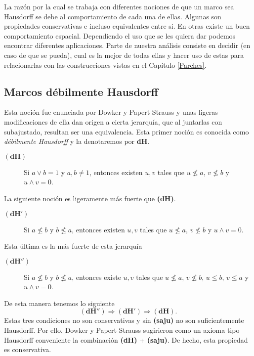 La razón por la cual se trabaja con diferentes nociones de que un marco sea Hausdorff se debe al comportamiento de cada una de ellas. Algunas son propiedades conservativas e incluso equivalentes entre si. En otras existe un buen comportamiento espacial. Dependiendo el uso que se les quiera dar podemos encontrar diferentes aplicaciones. Parte de nuestra análisis consiste en decidir (en caso de que se pueda), cual es la mejor de todas ellas y hacer uso de estas para relacionarlas con las construcciones vistas en el Capítulo \ref{Parches}.

\subsection{Marcos débilmente Hausdorff}

Esta noción fue enunciada por Dowker y Papert Strauss y unas ligeras modificaciones de ella dan origen a cierta jerarquía, que al juntarlas con subajustado, resultan ser una equivalencia. Esta primer noción es conocida como \emph{débilmente Hausdorff} y la denotaremos por \textbf{dH}.\\

\begin{description}
    \item[$\mathbf{(dH)}$] Si $a\vee b=1$ y $a, b\neq 1$, entonces existen $u, v$ tales que $u\nleq a$, $v\nleq b$ y $u\wedge v=0$. 
\end{description}

La siguiente noción es ligeramente más fuerte que \textbf{(dH)}.

\begin{description}
    \item[$\mathbf{(dH')}$] Si $a\nleq b$ y $b\nleq a$, entonces existen $u, v$ tales que $u\nleq a$, $v\nleq b$ y $u\wedge v=0$. 
\end{description}

Esta última es la más fuerte de esta jerarquía

\begin{description}
    \item[$\mathbf{(dH'')}$] Si $a\nleq b$ y $b\nleq a$, entonces existe $u, v$ tales que $u\nleq a$, $v\nleq b$, $u\leq b$, $v\leq a$ y $u\wedge v=0$.  
\end{description}

De esta manera tenemos lo siguiente
\[
\mathbf{(dH'')}\Rightarrow \mathbf{(dH')}\Rightarrow \mathbf{(dH)}.
\]
Estas tres condiciones no son conservativas y sin \textbf{(saju)} no son suficientemente Hausdorff. Por ello, Dowker y Papert Strauss sugirieron como un axioma tipo Hausdorff conveniente la combinación \textbf{(dH)} + \textbf{(saju)}. De hecho, esta propiedad es conservativa. 

